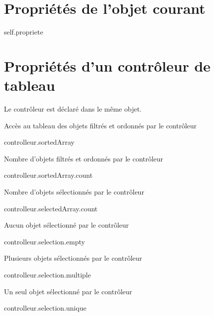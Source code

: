 



\section{Propriétés de l'objet courant}


\begin{ebcode}
self.propriete
\end{ebcode}



\section{Propriétés d'un contrôleur de tableau}

Le contrôleur est déclaré dans le même objet.

Accès au tableau des objets filtrés et ordonnés par le contrôleur
\begin{ebcode}
controlleur.sortedArray
\end{ebcode}

Nombre d'objets filtrés et ordonnés par le contrôleur
\begin{ebcode}
controlleur.sortedArray.count
\end{ebcode}

Nombre d'objets sélectionnés par le contrôleur
\begin{ebcode}
controlleur.selectedArray.count
\end{ebcode}

Aucun objet sélectionné par le contrôleur
\begin{ebcode}
controlleur.selection.empty
\end{ebcode}

Plusieurs objets sélectionnés par le contrôleur
\begin{ebcode}
controlleur.selection.multiple
\end{ebcode}

Un seul objet sélectionné par le contrôleur
\begin{ebcode}
controlleur.selection.unique
\end{ebcode}

